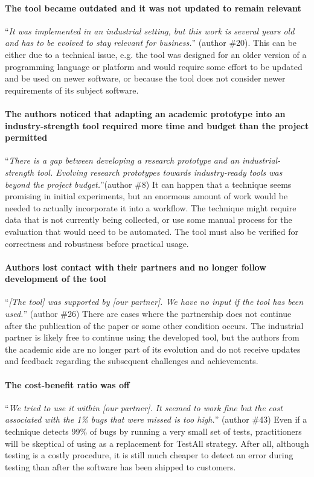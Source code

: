 \paragraph{The tool became outdated and it was not updated to remain relevant}
``\textit{It was implemented in an industrial setting, but this work is several years old and has to be evolved to stay relevant for business.}'' (author \#20).
This can be either due to a technical issue, e.g. the tool was designed for an older version of a programming language or platform and would require some effort to be updated and be used on newer software, or because the tool does not consider newer requirements of its subject software.

\paragraph{The authors noticed that adapting an academic prototype into an industry-strength tool required more time and budget than the project permitted}
``\textit{There is a gap between developing a research prototype and an industrial-strength tool. Evolving research prototypes towards industry-ready tools was beyond the project budget.}''(author \#8)
It can happen that a technique seems promising in initial experiments, but an enormous amount of work would be needed to actually incorporate it into a workflow.
The technique might require data that is not currently being collected, or use some manual process for the evaluation that would need to be automated.
The tool must also be verified for correctness and robustness before practical usage.

\paragraph{Authors lost contact with their partners and no longer follow development of the tool}
``\textit{[The tool] was supported by [our partner]. We have no input if the tool has been used.}'' (author \#26)
There are cases where the partnership does not continue after the publication of the paper or some other condition occurs.
The industrial partner is likely free to continue using the developed tool, but the authors from the academic side are no longer part of its evolution and do not receive updates and feedback regarding the subsequent challenges and achievements.

\paragraph{The cost-benefit ratio was off}
``\textit{We tried to use it within [our partner]. It seemed to work fine but the cost associated with the 1\% bugs that were missed is too high.}'' (author \#43)
Even if a \tcs technique detects 99\% of bugs by running a very small set of tests, practitioners will be skeptical of using as a replacement for TestAll strategy.
After all, although testing is a costly procedure, it is still much cheaper to detect an error during testing than after the software has been shipped to customers.

